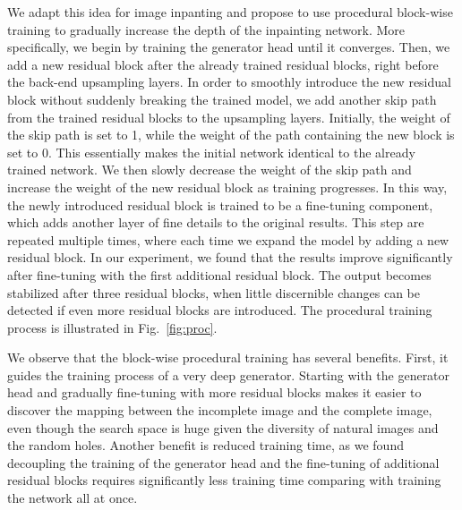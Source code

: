 We adapt this idea for image inpanting and propose to use procedural block-wise training to gradually increase the depth of the inpainting network. More specifically, we begin by training the generator head until it converges. Then, we add a new residual block after the already trained residual blocks, right before the back-end upsampling layers. In order to smoothly introduce the new residual block without suddenly breaking the trained model, we add another skip path from the trained residual blocks to the upsampling layers. Initially, the weight of the skip path is set to 1, while the weight of the path containing the new block is set to 0. This essentially makes the initial network identical to the already trained network. We then slowly decrease the weight of the skip path and increase the weight of the new residual block as training progresses. In this way, the newly introduced residual block is trained to be a fine-tuning component, which adds another layer of fine details to the original results. This step are repeated multiple times, where each time we expand the model by adding a new residual block. In our experiment, we found that the results improve significantly after fine-tuning with the first additional residual block. The output becomes stabilized after three residual blocks, when little discernible changes can be detected if even more residual blocks are introduced. The procedural training process is illustrated in Fig.~\ref{fig:proc}.

We observe that the block-wise procedural training has several benefits. First, it guides the training process of a very deep generator. Starting with the generator head and gradually fine-tuning with more residual blocks makes it easier to discover the mapping between the incomplete image and the complete image, even though the search space is huge given the diversity of natural images and the random holes. Another benefit is reduced training time, as we found decoupling the training of the generator head and the fine-tuning of additional residual blocks requires significantly less training time comparing with training the network all at once.

